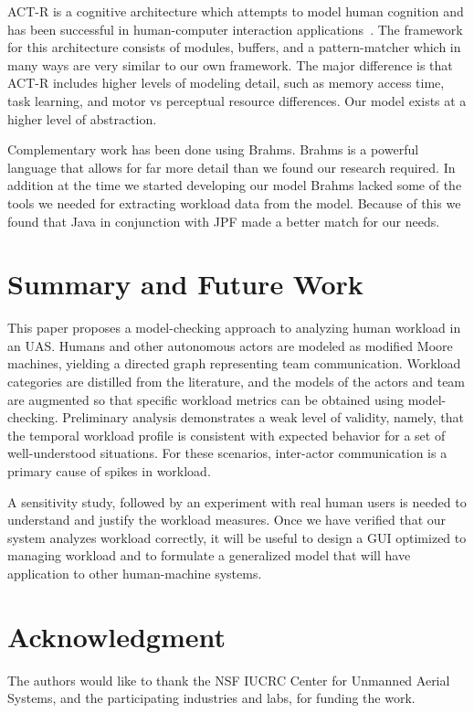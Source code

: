 ACT-R is a cognitive architecture which attempts to model human cognition and
has been successful in human-computer interaction applications~\cite{anderson2004integrated,lebiere2013cognitive}.  The
framework for this architecture consists of modules, buffers, and a pattern-matcher which in many ways are very similar to our own framework.  The major
difference is that ACT-R includes higher levels of modeling detail, such as memory access
time, task learning, and motor vs perceptual resource differences.  Our model exists at a higher level of abstraction.

Complementary work has been done using Brahms.
Brahms is a powerful language that allows for far more detail than we found our research required.
In addition at the time we started developing our model Brahms lacked some of the tools we needed for extracting workload data from the model. Because of this we found that Java in conjunction with JPF made a better match for our needs.

\section{Summary and Future Work}

This paper proposes a model-checking approach to analyzing human workload in an UAS.  Humans and other autonomous actors are modeled as modified Moore machines, yielding a directed graph representing team communication.  Workload categories are distilled from the literature, and the models of the actors and team are augmented so that specific workload metrics can be obtained using model-checking.  Preliminary analysis demonstrates a weak level of validity, namely, that the temporal workload profile is consistent with expected behavior for a set of well-understood situations.  For these scenarios, inter-actor communication is a primary cause of spikes in workload. 

A sensitivity study, followed by an experiment with real human users is needed to understand and justify the workload measures. Once we have verified that our system analyzes workload correctly, it will be useful to design a GUI optimized to managing workload and to formulate a generalized model that will have application to other human-machine systems.


\section*{Acknowledgment}
The authors would like to thank the NSF IUCRC Center for Unmanned Aerial Systems, and the participating industries and labs, for funding the work.